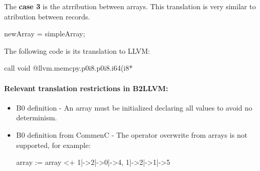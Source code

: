 The \textbf{case 3} is the atrribution between arrays. This translation is 
very similar to atribution between records.

\begin{pascalcode}
	newArray = simpleArray;
\end{pascalcode}


The following code is its translation to LLVM:

\begin{llvmcode}
call void @llvm.memcpy.p0i8.p0i8.i64(i8* %
\end{llvmcode}




\paragraph{Relevant translation restrictions in B2LLVM:}
\begin{itemize}
\item  B0 definition - An array must be initialized declaring all values 
to avoid no determinism.
\item B0 definition from CommenC - The operator overwrite from arrays is not supported, for example:

\begin{pascalcode}
array := array <+ {1|->2|->0|->4,  1|->2|->1|->5}
\end{pascalcode}

\end{itemize}


